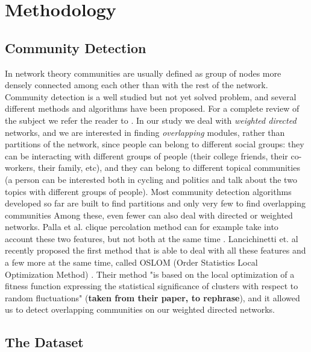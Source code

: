 \section{Methodology}

\subsection{Community Detection}

In network theory communities are usually defined as group of nodes more densely connected among each other than with the rest of the network. Community detection is a well studied but not yet solved problem, and several different methods and algorithms have been proposed. For a complete review of the subject we refer the reader to \cite{fortunato2010community}. In our study we deal with \textit{weighted directed} networks, and we are interested in finding \textit{overlapping} modules, rather than partitions of the network, since people can belong to different social groups: they can be interacting with different groups of people (their college friends, their co-workers, their family, etc), and they can belong to different topical communities (a person can be interested both in cycling and politics and talk about the two topics with different groups of people). Most community detection algorithms developed so far are built to find partitions and only very few to find overlapping communities \cite{BaumesGKMP05,PalEtAl05,ZhaWanZha07,Gre07,PhysRevE.77.016107,Lancichinetti2009,PhysRevE.80.016105,Kovacs2010} Among these, even fewer can also deal with directed or weighted networks. Palla et al. clique percolation method can for example take into account these two features, but not both at the same time \cite{PalEtAl05}. Lancichinetti et. al recently proposed the first method that is able to deal with all these features and a few more at the same time, called OSLOM (Order Statistics Local Optimization Method) \cite{LancichinettiPlos}. Their method "is based on the local optimization of a fitness function expressing the statistical significance of clusters with respect to random fluctuations" (\textbf{taken from their paper, to rephrase}), and it allowed us to detect overlapping communities on our weighted directed networks.

\subsection{The Dataset}


